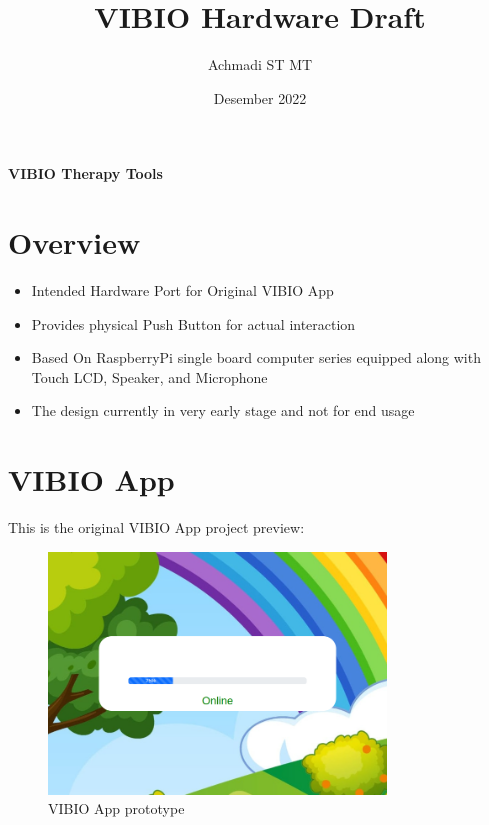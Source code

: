 \documentclass[a4paper,12pt,oneside,pdflatex,italian,final,twocolumn]{article}
\title{VIBIO Hardware Draft}
\author{Achmadi ST MT}
\date{Desember 2022}
\begin{document}
\pagestyle{fancy}

\chead{\today}

\onecolumn

\begin{figure}

\end{figure}\begin{minipage}{0.47\textwidth}
\centering

\end{minipage}
\hfill
\begin{minipage}{0.47\textwidth}
\raggedleft
\Huge \textbf{VIBIO Therapy Tools}
\end{minipage}

\section{Overview}

\begin{itemize}
    \item Intended  Hardware Port for Original VIBIO App

    \item Provides physical Push Button for actual interaction

    \item Based On RaspberryPi single board computer series equipped along with Touch LCD, Speaker, and Microphone

    \item The design currently in very early stage and not for end usage

\end{itemize}

\raggedright
\section{VIBIO App}

This is the original VIBIO App project preview:

\centering
\begin{figure} [h]
\centering
\includegraphics[width=0.8\textwidth,]{images/appstart.png}
\caption{VIBIO App prototype}
\end{figure}
\end{document}

